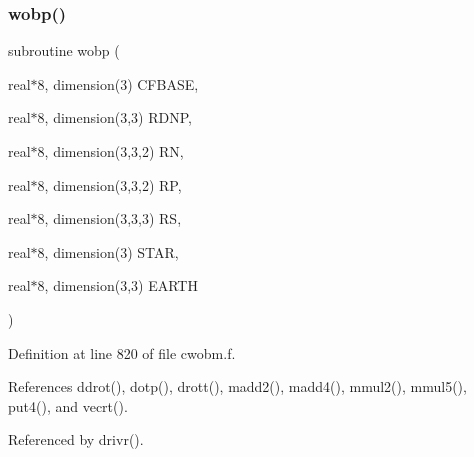 \subsubsection{\texorpdfstring{wobp()}{wobp()}}
{\footnotesize\ttfamily subroutine wobp (\begin{DoxyParamCaption}\item[{real$\ast$8, dimension(3)}]{C\+F\+B\+A\+SE,  }\item[{real$\ast$8, dimension(3,3)}]{R\+D\+NP,  }\item[{real$\ast$8, dimension(3,3,2)}]{RN,  }\item[{real$\ast$8, dimension(3,3,2)}]{RP,  }\item[{real$\ast$8, dimension(3,3,3)}]{RS,  }\item[{real$\ast$8, dimension(3)}]{S\+T\+AR,  }\item[{real$\ast$8, dimension(3,3)}]{E\+A\+R\+TH }\end{DoxyParamCaption})}



Definition at line 820 of file cwobm.\+f.



References ddrot(), dotp(), drott(), madd2(), madd4(), mmul2(), mmul5(), put4(), and vecrt().



Referenced by drivr().

